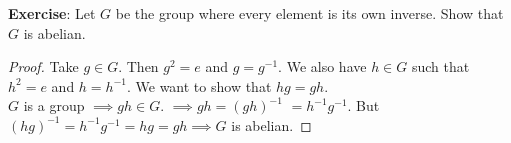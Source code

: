 \documentclass{report}
\begin{document}
\textbf{Exercise}: Let $G$ be the group where every element is its own inverse. Show that $G$ is abelian.
\begin{proof}
Take $g \in G$. Then $g^2 = e$ and $g = g^{-1}$. We also have $h \in G$ such that $h^2 = e$ and $h = h^{-1}$. We want to show that $hg = gh$.\\
$G$ is a group $\implies gh \in G.$ 
$\implies gh = (gh)^{-1}$
$=h^{-1}g^{-1}$.
But $(hg)^{-1} = h^{-1}g^{-1} = hg = gh \implies G$ is abelian.
\end{proof} 
\end{document}
